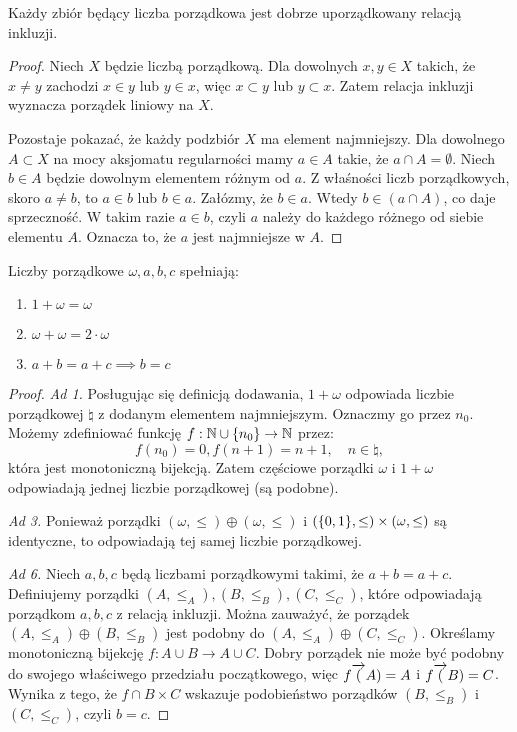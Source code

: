 \begin{theorem}
    Każdy zbiór będący liczba porządkowa jest dobrze uporządkowany relacją inkluzji.
\end{theorem}
\begin{proof}
    Niech \( X \) będzie liczbą porządkową. Dla dowolnych \( x,y \in X \) takich, że \( x \neq y \) zachodzi \( x \in y \) lub \( y \in x \),
    więc \( x \subset y \) lub \( y \subset x \). Zatem relacja inkluzji wyznacza porządek liniowy na  \( X \).

    Pozostaje pokazać, że każdy podzbiór \( X \) ma element najmniejszy. Dla dowolnego \( A \subset X \) na mocy aksjomatu regularności mamy \( a \in A \) takie, że \( a \cap A = \emptyset \).
    Niech \( b \in A \) będzie dowolnym elementem różnym od \( a \). Z właśności liczb porządkowych, skoro \( a \neq b \), to \( a \in b \) lub \( b \in a \).
    Załózmy, że \( b \in a \). Wtedy \( b \in (a \cap A) \), co daje sprzeczność. W takim razie \( a \in b \), czyli \( a \) należy do każdego różnego od siebie elementu \( A \). Oznacza to, że \( a \) jest najmniejsze w \( A \).
\end{proof}

\begin{lemma}
    Liczby porządkowe \( \omega, a, b, c \) spełniają:
    \begin{enumerate}
        \item \( 1 + \omega = \omega \)
        \item \( \omega + \omega = 2 \cdot \omega \)
        \item \( a + b = a + c \implies b = c \)
    \end{enumerate}
\end{lemma}
\begin{proof}
    \textit{Ad 1.} Posługując się definicją dodawania, \( 1 + \omega \) odpowiada liczbie porządkowej \( \natural \) z dodanym elementem najmniejszym. Oznaczmy go przez \( n_0 \).
    Możemy zdefiniować funkcję \( f : \natural \cup \set{n_0} \rightarrow \natural \) przez:
    \[
        f(n_0) = 0, f(n + 1) = n + 1, \quad n \in \natural,
    \]
    która jest monotoniczną bijekcją. Zatem częściowe porządki \( \omega \) i \( 1 + \omega \) odpowiadają jednej liczbie porządkowej (są podobne).

    \textit{Ad 3.} Ponieważ porządki \( (\omega, \leq) \oplus (\omega, \leq) \) i \( (\set{0, 1}, \leq) \times (\omega, \leq) \) są identyczne, to odpowiadają tej samej liczbie porządkowej.

    \textit{Ad 6.} Niech \( a, b, c \) będą liczbami porządkowymi takimi, że \( a + b = a + c \). Definiujemy porządki \( (A, \leq_A), (B, \leq_B), (C, \leq_C) \), które odpowiadają porządkom \(a, b, c \) z relacją inkluzji.
    Można zauważyć, że porządek \( (A, \leq_A) \oplus (B, \leq_B) \) jest podobny do \( (A, \leq_A) \oplus (C, \leq_C) \). Określamy monotoniczną bijekcję \( f : A \cup B \rightarrow A \cup C \).
    Dobry porządek nie może być podobny do swojego właściwego przedziału początkowego, więc \( f\overrightarrow(A) = A \) i \( f\overrightarrow(B) = C \).
    Wynika z tego, że \( f \cap B \times C \) wskazuje podobieństwo porządków \( (B, \leq_B) \) i \( (C, \leq_C) \), czyli \( b = c \).
\end{proof}